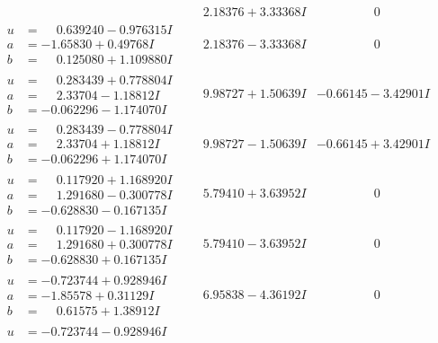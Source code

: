 \documentclass[1p]{elsarticle_modified}
\theoremstyle{definition}
\begin{document}
$$\begin{array}{c|c|c}
 & \phantom{-}2.18376 + 3.33368 I & \phantom{-0.000000 } 0 \\ \hline\begin{aligned}
u &= \phantom{-}0.639240 - 0.976315 I \\
a &= -1.65830 + 0.49768 I \\
b &= \phantom{-}0.125080 + 1.109880 I\end{aligned}
 & \phantom{-}2.18376 - 3.33368 I & \phantom{-0.000000 } 0 \\ \hline\begin{aligned}
u &= \phantom{-}0.283439 + 0.778804 I \\
a &= \phantom{-}2.33704 - 1.18812 I \\
b &= -0.062296 - 1.174070 I\end{aligned}
 & \phantom{-}9.98727 + 1.50639 I & -0.66145 - 3.42901 I \\ \hline\begin{aligned}
u &= \phantom{-}0.283439 - 0.778804 I \\
a &= \phantom{-}2.33704 + 1.18812 I \\
b &= -0.062296 + 1.174070 I\end{aligned}
 & \phantom{-}9.98727 - 1.50639 I & -0.66145 + 3.42901 I \\ \hline\begin{aligned}
u &= \phantom{-}0.117920 + 1.168920 I \\
a &= \phantom{-}1.291680 - 0.300778 I \\
b &= -0.628830 - 0.167135 I\end{aligned}
 & \phantom{-}5.79410 + 3.63952 I & \phantom{-0.000000 } 0 \\ \hline\begin{aligned}
u &= \phantom{-}0.117920 - 1.168920 I \\
a &= \phantom{-}1.291680 + 0.300778 I \\
b &= -0.628830 + 0.167135 I\end{aligned}
 & \phantom{-}5.79410 - 3.63952 I & \phantom{-0.000000 } 0 \\ \hline\begin{aligned}
u &= -0.723744 + 0.928946 I \\
a &= -1.85578 + 0.31129 I \\
b &= \phantom{-}0.61575 + 1.38912 I\end{aligned}
 & \phantom{-}6.95838 - 4.36192 I & \phantom{-0.000000 } 0 \\ \hline\begin{aligned}
u &= -0.723744 - 0.928946 I \\

\end{aligned}
\end{array}$$
\end{document}

